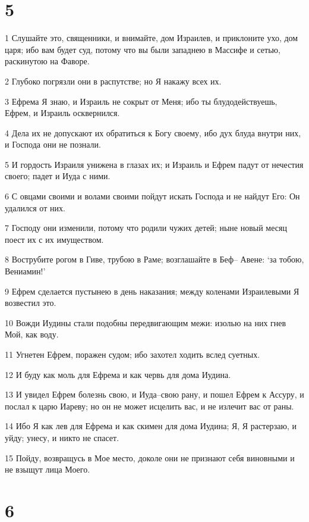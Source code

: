 \chapter{5}

\par 1 Слушайте это, священники, и внимайте, дом Израилев, и приклоните ухо, дом царя; ибо вам будет суд, потому что вы были западнею в Массифе и сетью, раскинутою на Фаворе.
\par 2 Глубоко погрязли они в распутстве; но Я накажу всех их.
\par 3 Ефрема Я знаю, и Израиль не сокрыт от Меня; ибо ты блудодействуешь, Ефрем, и Израиль осквернился.
\par 4 Дела их не допускают их обратиться к Богу своему, ибо дух блуда внутри них, и Господа они не познали.
\par 5 И гордость Израиля унижена в глазах их; и Израиль и Ефрем падут от нечестия своего; падет и Иуда с ними.
\par 6 С овцами своими и волами своими пойдут искать Господа и не найдут Его: Он удалился от них.
\par 7 Господу они изменили, потому что родили чужих детей; ныне новый месяц поест их с их имуществом.
\par 8 Вострубите рогом в Гиве, трубою в Раме; возглашайте в Беф-- Авене: `за тобою, Вениамин!'
\par 9 Ефрем сделается пустынею в день наказания; между коленами Израилевыми Я возвестил это.
\par 10 Вожди Иудины стали подобны передвигающим межи: изолью на них гнев Мой, как воду.
\par 11 Угнетен Ефрем, поражен судом; ибо захотел ходить вслед суетных.
\par 12 И буду как моль для Ефрема и как червь для дома Иудина.
\par 13 И увидел Ефрем болезнь свою, и Иуда--свою рану, и пошел Ефрем к Ассуру, и послал к царю Иареву; но он не может исцелить вас, и не излечит вас от раны.
\par 14 Ибо Я как лев для Ефрема и как скимен для дома Иудина; Я, Я растерзаю, и уйду; унесу, и никто не спасет.
\par 15 Пойду, возвращусь в Мое место, доколе они не признают себя виновными и не взыщут лица Моего.

\chapter{6}

